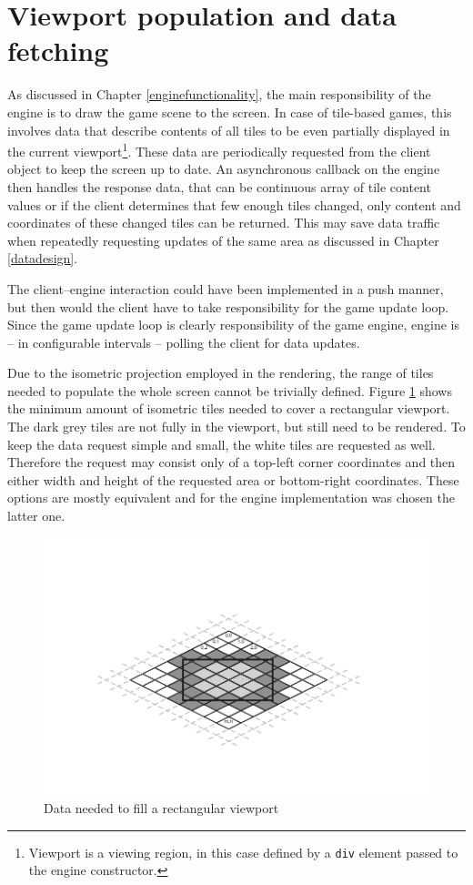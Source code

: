 \documentclass[11pt,oneside, final]{fithesis2}
\begin{document}
\section{Viewport population and data fetching}
As discussed in Chapter \ref{enginefunctionality}, the main responsibility of the engine is to draw the game scene to the screen. In case of tile-based games, this involves data that describe contents of all tiles to be even partially displayed in the current viewport\footnote{Viewport is a viewing region, in this case defined by a \texttt{div} element passed to the engine constructor.}. These data are periodically requested from the client object to keep the screen up to date. An asynchronous callback on the engine then handles the response data, that can be continuous array of tile content values or if the client determines that few enough tiles changed, only content and coordinates of these changed tiles can be returned. This may save data traffic when repeatedly requesting updates of the same area as discussed in Chapter \ref{datadesign}.

The client--engine interaction could have been implemented in a push manner, but then would the client have to take responsibility for the game update loop. Since the game update loop is clearly responsibility of the game engine\cite{gregory}, engine is -- in configurable intervals -- polling the client for data updates.

Due to the isometric projection employed in the rendering, the range of tiles needed to populate the whole screen cannot be trivially defined. Figure \ref{isodata} shows the minimum amount of isometric tiles needed to cover a rectangular viewport. The dark grey tiles are not fully in the viewport, but still need to be rendered. To keep the data request simple and small, the white tiles are requested as well. Therefore the request may consist only of a top-left corner coordinates and then either width and height of the requested area or bottom-right coordinates. These options are mostly equivalent and for the engine implementation was chosen the latter one.

\begin{figure}[h]
	\centering
	\includegraphics[clip=true,trim=20mm 17mm 20mm 23mm]{thesis-isodata}
	\caption{Data needed to fill a rectangular viewport}
	\label{isodata}
\end{figure}
\end{document}
